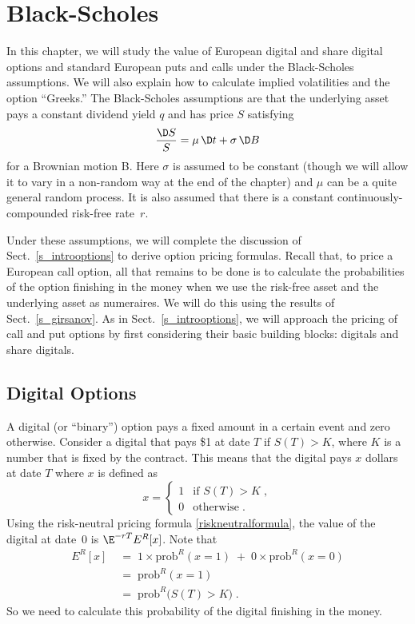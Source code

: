 \chapter{Black-Scholes}\label{c_blackscholes}

In this chapter, we will study the value of European digital and share digital options and standard European puts and calls under the Black-Scholes assumptions.  We will also explain how to calculate implied volatilities and the option ``Greeks.''  The Black-Scholes assumptions are that the underlying asset pays a constant dividend yield $q$ and has price $S$ satisfying
\begin{equation}\label{bs1}
\frac{\D S}{S} = \mu\,\D t + \sigma\,\D B
\end{equation}
for a Brownian motion B.  Here $\sigma$ is assumed to be constant (though we will allow it to vary in a non-random way at the end of the chapter) and $\mu$ can be a quite general random process.  It is also assumed that there is a constant continuously-compounded risk-free rate~$r$.

Under these assumptions, we will complete the discussion of Sect.~\ref{s_introoptions} to derive  option pricing formulas.  Recall that, to price a European call option, all that remains to be done is to calculate the probabilities of the option finishing in the money when we use the risk-free asset and the underlying asset as numeraires.  We will do this using the results of Sect.~\ref{s_girsanov}.  As in Sect.~\ref{s_introoptions}, we will approach the pricing of call and put options by first considering their basic building blocks: digitals and share digitals.



\section{Digital Options}\label{s_digitals}

A digital (or ``binary'')  option pays a fixed amount in a certain event and zero otherwise.  Consider a digital that pays \$1 at date $T$ if $S(T)>K$, where $K$ is a number that is fixed by the contract.  This means that the digital pays $x$ dollars at date $T$ where $x$ is defined as
\begin{equation*}
x =  \begin{cases} 1 & \text{if $S(T)>K$}\; ,\\
0 & \text{otherwise}\;.
\end{cases}
\end{equation*}
 Using the risk-neutral pricing formula \eqref{riskneutralformula}, the value of the digital at date~0 is $\E^{-rT}E^R[x]$.  Note that
\begin{align*}
E^R[x] \;&=\; 1 \times \text{prob}^R(x=1)\; + \;0 \times \text{prob}^R(x\!\!=\!\!0) \\
\;&=\; \text{prob}^R(x=1)\\
\;&=\; \text{prob}^R\big(S(T) > K\big)\;.
\end{align*}
So we need to calculate this probability of the digital finishing in the money.

